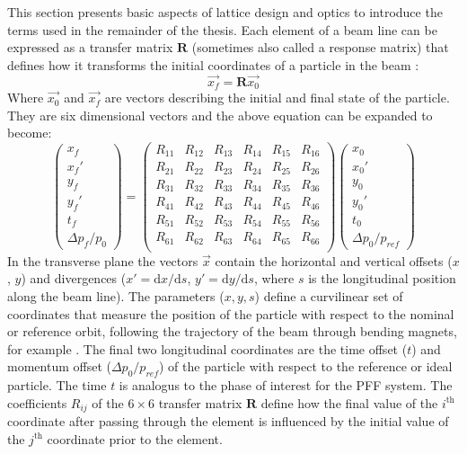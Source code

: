 This section presents basic aspects of lattice design and optics to introduce the terms used in the remainder of the thesis. Each element of a beam line can be expressed as a transfer matrix \(\mathbf{R}\) (sometimes also called a response matrix) that defines how it transforms the initial coordinates of a particle in the beam \cite{wilson}:
\begin{equation}
\vec{x_f} = \mathbf{R}\vec{x_0}
\end{equation}
Where \(\vec{x_0}\) and \(\vec{x_f}\) are vectors describing the initial and final state of the particle. They are six dimensional vectors and the above equation can be expanded to become:
\begin{equation}
\left( \begin{array}{c} x_f \\ x_f' \\ y_f \\ y_f' \\ t_f \\ \Delta p_f/p_0 \end{array} \right)
=
\left( \begin{array}{cccccc} 
R_{11} & R_{12} & R_{13} & R_{14} & R_{15} & R_{16}\\ 
R_{21} & R_{22} & R_{23} & R_{24}  & R_{25} & R_{26}\\ 
R_{31} & R_{32} & R_{33} & R_{34}  & R_{35} & R_{36}\\
R_{41} & R_{42} & R_{43} & R_{44}  & R_{45} & R_{46}\\
R_{51} & R_{52} & R_{53} & R_{54}  & R_{55} & R_{56}\\
R_{61} & R_{62} & R_{63} & R_{64}  & R_{65} & R_{66}\\
\end{array} \right)
\left( \begin{array}{c} x_0 \\ x_0' \\ y_0 \\ y_0' \\ t_0 \\ \Delta p_0/p_{ref} \end{array} \right)
\end{equation}
In the transverse plane the vectors \(\vec{x}\) contain the horizontal and vertical offsets (\(x\), \(y\)) and divergences (\(x' = \mathrm{d}x/\mathrm{d}s\), \(y' = \mathrm{d}y/\mathrm{d}s\), where \(s\) is the longitudinal position along the beam line). The parameters (\(x, y, s\)) define a curvilinear set of coordinates that measure the position of the particle with respect to the nominal or reference orbit, following the trajectory of the beam through bending magnets, for example \cite{wilson}. The final two longitudinal coordinates are the time offset (\(t\)) and momentum offset (\(\Delta p_0/p_{ref}\)) of the particle with respect to the reference or ideal particle. The time \(t\) is analogus to the phase of interest for the PFF system. The coefficients \(R_{ij}\) of the \(6\times6\) transfer matrix \(\mathbf{R}\) define how the final value of the \(i^{\mathrm{th}}\) coordinate after passing through the element is influenced by the initial value of the \(j^{\mathrm{th}}\) coordinate prior to the element.

